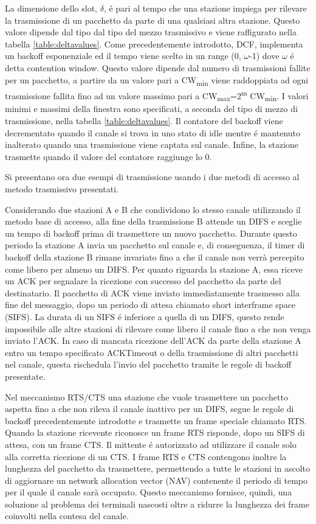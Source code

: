 La dimensione dello slot, $\delta$,  \'e pari al tempo che una stazione impiega per rilevare la trasmissione di un pacchetto da parte di una qualsiasi altra stazione.
Questo valore dipende dal tipo dal tipo del mezzo trasmissivo e viene raffigurato nella tabella \ref{table:deltavalues}.
Come precedentemente introdotto, DCF, implementa un backoff esponenziale ed il tempo viene scelto in un range (0, $\omega$-1) dove $\omega$ \'e detta contention window.
Questo valore dipende dal numero di trasmissioni fallite per un pacchetto, a partire da un valore pari a CW\textsubscript{min}  viene raddoppiata ad ogni trasmissione fallita fino ad un valore massimo pari a CW\textsubscript{max}=2\textsuperscript{m} CW\textsubscript{min}.
I valori minimi e massimi della finestra sono specificati, a seconda del tipo di mezzo di trasmissione, nella tabella \ref{table:deltavalues}.
Il contatore del backoff viene decrementato quando il canale si trova in uno stato di idle mentre \'e mantenuto inalterato quando una trasmissione viene captata sul canale.
Infine, la stazione trasmette quando il valore del contatore raggiunge lo 0.

Si presentano ora due esempi di trasmissione usando i due metodi di accesso al metodo trasmissivo presentati.

Considerando due stazioni A e B che condividono lo stesso canale utilizzando il metodo base di accesso, alla fine della trasmissione B attende un DIFS e sceglie un tempo di backoff prima di trasmettere un nuovo pacchetto.
Durante questo periodo la stazione A invia un pacchetto sul canale e, di conseguenza, il timer di backoff della stazione B rimane invariato fino a che il canale non verr\`a percepito come libero per almeno un DIFS.
Per quanto riguarda la stazione A, essa riceve un ACK per segnalare la ricezione con successo del pacchetto da parte del destinatario.
Il pacchetto di ACK viene inviato immediatamente trasmesso alla fine del messaggio, dopo un periodo di attesa chiamato short interframe space (SIFS).
La durata di un SIFS \'e inferiore a quella di un DIFS, questo rende impossibile alle altre stazioni di rilevare come libero il canale fino a che non venga inviato l'ACK.
In caso di mancata ricezione dell'ACK da parte della stazione A entro un tempo specificato ACKTimeout o della trasmissione di altri pacchetti nel canale, questa rischedula l'invio del pacchetto tramite le regole di backoff presentate.

Nel meccanismo RTS/CTS una stazione che vuole trasmettere un pacchetto aspetta fino a che non rileva il canale inattivo per un DIFS, segue le regole di backoff precedentemente introdotte e trasmette un frame speciale chiamato RTS.
Quando la stazione ricevente riconosce un frame RTS risponde, dopo un SIFS di attesa, con un frame CTS.
Il mittente \'e autorizzato ad utilizzare il canale solo alla corretta ricezione di un CTS.
I frame RTS e CTS contengono inoltre la lunghezza del pacchetto da trasmettere, permettendo a tutte le stazioni in ascolto di aggiornare un network allocation vector (NAV) contenente il periodo di tempo per il quale il canale sar\`a occupato.
Questo meccanismo fornisce, quindi, una soluzione al problema dei terminali nascosti oltre a ridurre la lunghezza dei frame coinvolti nella contesa del canale.

